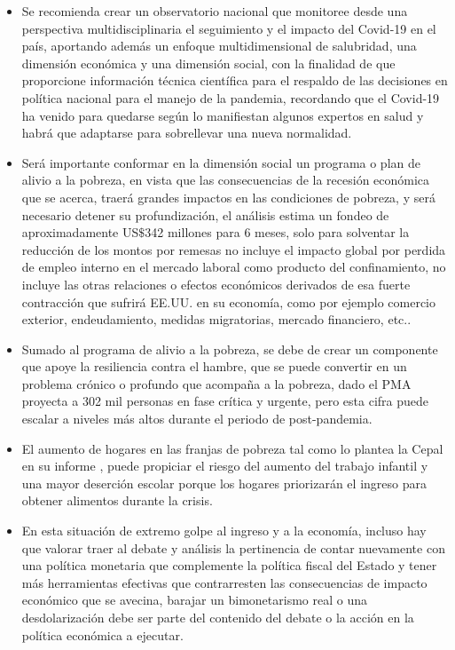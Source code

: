 \begin{itemize}
	\item Se recomienda crear un observatorio nacional que monitoree desde una perspectiva multidisciplinaria el seguimiento y el impacto del Covid-19 en el país, aportando además un enfoque multidimensional de salubridad, una dimensión económica y una dimensión social, con la finalidad de que proporcione información técnica científica para el respaldo de las decisiones en política nacional para el manejo de la pandemia, recordando que el Covid-19 ha venido para quedarse según lo manifiestan algunos expertos en salud y habrá que adaptarse para sobrellevar una nueva normalidad.
	\item Será importante conformar en la dimensión social un programa o plan de alivio a la pobreza, en vista que las consecuencias de la recesión económica que se acerca, traerá grandes impactos en las condiciones de pobreza, y será necesario detener su profundización, el análisis estima un fondeo de aproximadamente US$\$$342 millones para 6 meses, solo para solventar la reducción de los montos por remesas no incluye el impacto global por perdida de empleo interno en el mercado laboral como producto del confinamiento, no incluye las otras relaciones o efectos económicos derivados de esa fuerte contracción que sufrirá EE.UU. en su economía, como por ejemplo comercio exterior, endeudamiento, medidas migratorias, mercado financiero, etc..
	\item Sumado al programa de alivio a la pobreza, se debe de crear un componente que apoye la resiliencia contra el hambre, que se puede convertir en un problema crónico o profundo que acompaña a la pobreza, dado el PMA proyecta a 302 mil personas en fase crítica y urgente, pero esta cifra puede escalar a niveles más altos durante el periodo de post-pandemia.
	\item El aumento de hogares en las franjas de pobreza tal como lo plantea la Cepal  en su informe \cite{cepal2020desafio}, puede propiciar el riesgo del aumento del trabajo infantil y una mayor deserción escolar porque los hogares priorizarán el ingreso para obtener alimentos durante la crisis.
	\item En esta situación de extremo golpe al ingreso y a la economía, incluso hay que valorar traer al debate y análisis la pertinencia de contar nuevamente con una política monetaria que complemente la política fiscal del Estado y tener más herramientas efectivas que contrarresten las consecuencias de impacto económico que se avecina, barajar un bimonetarismo real o una desdolarización debe ser parte del contenido del debate o la acción en la política económica a ejecutar.	

\end{itemize}
